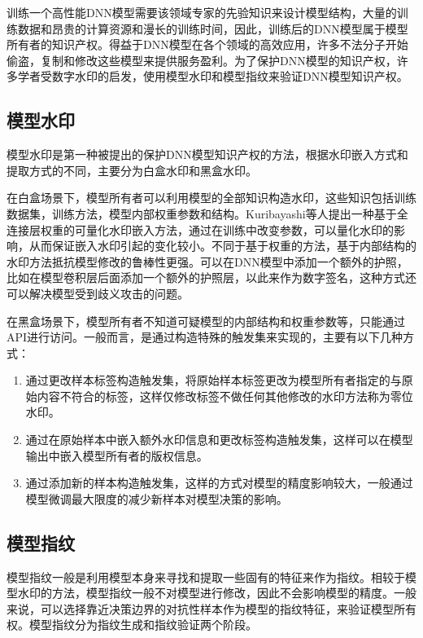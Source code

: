 训练一个高性能DNN模型需要该领域专家的先验知识来设计模型结构，大量的训练数据和昂贵的计算资源和漫长的训练时间，因此，训练后的DNN模型属于模型所有者的知识产权。得益于DNN模型在各个领域的高效应用，许多不法分子开始偷盗，复制和修改这些模型来提供服务盈利。为了保护DNN模型的知识产权，许多学者受数字水印的启发，使用模型水印和模型指纹来验证DNN模型知识产权。

\subsection{模型水印}

模型水印是第一种被提出的保护DNN模型知识产权的方法，根据水印嵌入方式和提取方式的不同，主要分为白盒水印和黑盒水印。

在白盒场景下，模型所有者可以利用模型的全部知识构造水印，这些知识包括训练数据集，训练方法，模型内部权重参数和结构。Kuribayashi等人\cite{kuribayashi2020deepwatermark}提出一种基于全连接层权重的可量化水印嵌入方法，通过在训练中改变参数，可以量化水印的影响，从而保证嵌入水印引起的变化较小。不同于基于权重的方法，基于内部结构的水印方法抵抗模型修改的鲁棒性更强。可以在DNN模型中添加一个额外的护照\cite{fan2019rethinking}，比如在模型卷积层后面添加一个额外的护照层，以此来作为数字签名，这种方式还可以解决模型受到歧义攻击的问题。

在黑盒场景下，模型所有者不知道可疑模型的内部结构和权重参数等，只能通过API进行访问。一般而言，是通过构造特殊的触发集来实现的，主要有以下几种方式：

\begin{enumerate}
	\renewcommand{\labelenumi}{\theenumi)}
	\item 通过更改样本标签构造触发集，将原始样本标签更改为模型所有者指定的与原始内容不符合的标签，这样仅修改标签不做任何其他修改的水印方法称为零位水印。
	\item 通过在原始样本中嵌入额外水印信息和更改标签构造触发集，这样可以在模型输出中嵌入模型所有者的版权信息。
	\item 通过添加新的样本构造触发集，这样的方式对模型的精度影响较大，一般通过模型微调最大限度的减少新样本对模型决策的影响。
\end{enumerate}


\subsection{模型指纹}

模型指纹一般是利用模型本身来寻找和提取一些固有的特征来作为指纹。相较于模型水印的方法，模型指纹一般不对模型进行修改，因此不会影响模型的精度。一般来说，可以选择靠近决策边界的对抗性样本作为模型的指纹特征，来验证模型所有权。模型指纹分为指纹生成和指纹验证两个阶段。

